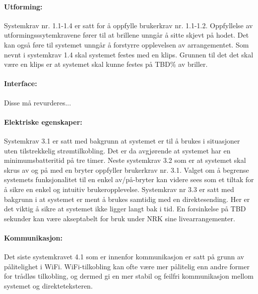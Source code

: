 \paragraph{Utforming: } 
Systemkrav nr. 1.1-1.4 er satt for å oppfylle brukerkrav nr. 1.1-1.2. Oppfyllelse av utformingsssytemkravene fører til at brillene unngår å sitte skjevt på hodet. Det kan også føre til systemet unngår å forstyrre opplevelsen av arrangementet. Som nevnt i systemkrav 1.4 skal systemet festes med en klips. Grunnen til det det skal være en klips er at systemet skal kunne festes på TBD\% av briller.  


\paragraph{Interface: }
Disse må revurderes...


\paragraph{Elektriske egenskaper: }
Systemkrav 3.1 er satt med bakgrunn at systemet er til å brukes i situasjoner uten tilstrekkelig strømtilkobling. Det er da avgjørende at systemet har en minimumsbatteritid på tre timer. Neste systemkrav 3.2 som er at systemet skal skrus av og på med en bryter oppfyller brukerkrav nr. 3.1. Valget om å begrense systemets funksjonalitet til en enkel av/på-bryter kan videre sees som et tiltak for å sikre en enkel og intuitiv brukeropplevelse. Systemkrav nr 3.3 er satt med bakgrunn i at systemet er ment å brukes samtidig med en direktesending. Her er det viktig å sikre at systemet ikke ligger langt bak i tid. En forsinkelse på TBD sekunder kan være akseptabelt for bruk under NRK sine livearrangementer. 


\paragraph{Kommunikasjon: }
Det siste systemkravet 4.1 som er innenfor kommunikasjon er satt på grunn av pålitelighet i WiFi. WiFi-tilkobling kan ofte være mer pålitelig enn andre former for trådløs tilkobling, og dermed gi en mer stabil og feilfri kommunikasjon mellom systemet og direkteteksteren.


